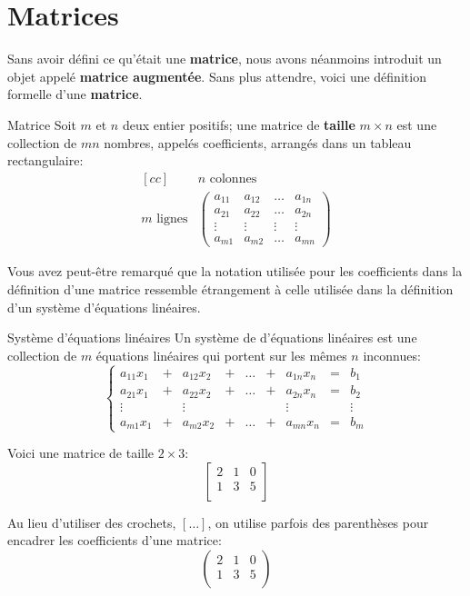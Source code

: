 \chapter{Matrices}
Sans avoir défini ce qu'était une \textbf{matrice}, nous avons
néanmoins introduit un objet appelé \textbf{matrice augmentée}.
Sans plus attendre, voici une définition formelle d'une \textbf{matrice}.

\begin{TrueDef}{Matrice}
Soit $m$ et $n$ deux entier positifs; une matrice de \textbf{taille}
$m\times n$
est une collection de $mn$ nombres, appelés coefficients, arrangés dans un tableau rectangulaire:
\[
\begin{matrix}[cc]
&\text{$n$ colonnes} \\
\text{$m$ lignes}& \begin{pmatrix}
        a_{11} & a_{12} & \ldots & a_{1n}\\
        a_{21} & a_{22} & \ldots & a_{2n}\\
        \vdots & \vdots & \vdots & \vdots \\
        a_{m1} & a_{m2} & \ldots & a_{mn}
        \end{pmatrix}
  \end{matrix}
\]
\end{TrueDef}

Vous avez peut-être remarqué que la notation utilisée pour
les coefficients dans la définition
d'une matrice ressemble étrangement à celle utilisée dans la définition d'un système d'équations linéaires.

\begin{TrueDef}{Système d'équations linéaires}
Un système de d'équations linéaires est une
collection de $m$ équations linéaires qui portent
sur les mêmes $n$ inconnues:
\[
\left\{
	\begin{matrix}
	a_{11}x_1 &+& a_{12}x_2 &+& \ldots &+& a_{1n}x_n &=& b_1 \\
	a_{21}x_1 &+& a_{22}x_2 &+& \ldots &+& a_{2n}x_n &=& b_2 \\
	\vdots && \vdots &&  && \vdots && \vdots \\
	a_{m1}x_1 &+& a_{m2}x_2 &+& \ldots &+& a_{mn}x_n &=& b_m
	\end{matrix}
	\right.
\]
\end{TrueDef}

\begin{Example}
Voici une matrice de taille $2 \times 3$:
\[\begin{bmatrix} 2 & 1 & 0 \\ 1 & 3 & 5 \\ \end{bmatrix}\]

Au lieu d'utiliser des crochets, $[\ldots]$,
  on utilise parfois des parenthèses pour encadrer les coefficients d'une matrice:
  \[\begin{pmatrix} 2 & 1 & 0 \\ 1 & 3 & 5 \\ \end{pmatrix}\]
\end{Example}

